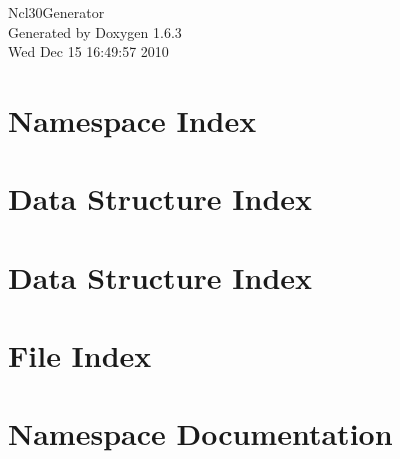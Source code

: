 \documentclass[a4paper]{book}
\begin{document}
\hypersetup{pageanchor=false}
\begin{titlepage}
\vspace*{7cm}
\begin{center}
{\Large Ncl30Generator }\\
\vspace*{1cm}
{\large Generated by Doxygen 1.6.3}\\
\vspace*{0.5cm}
{\small Wed Dec 15 16:49:57 2010}\\
\end{center}
\end{titlepage}
\clearemptydoublepage
{}
\tableofcontents
\clearemptydoublepage
{}
\hypersetup{pageanchor=true}
\chapter{Namespace Index}

\chapter{Data Structure Index}

\chapter{Data Structure Index}

\chapter{File Index}

\chapter{Namespace Documentation}





\end{document}
